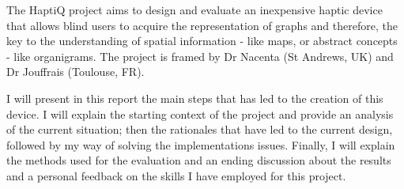 The HaptiQ project aims to design and evaluate an inexpensive haptic
device that allows blind users to acquire the representation of graphs
and therefore, the key to the understanding of spatial information -
like maps, or abstract concepts - like organigrams. The project is
framed by Dr Nacenta (St Andrews, UK) and Dr Jouffrais (Toulouse, FR).

I will present in this report the main steps that has led to the
creation of this device. I will explain the starting context of the
project and provide an analysis of the current situation; then the rationales that have led to the current design, followed by my way of solving the implementations issues. Finally, I will
explain the methods used for the evaluation and an ending discussion
about the results and a personal feedback on the skills I have employed for this project.